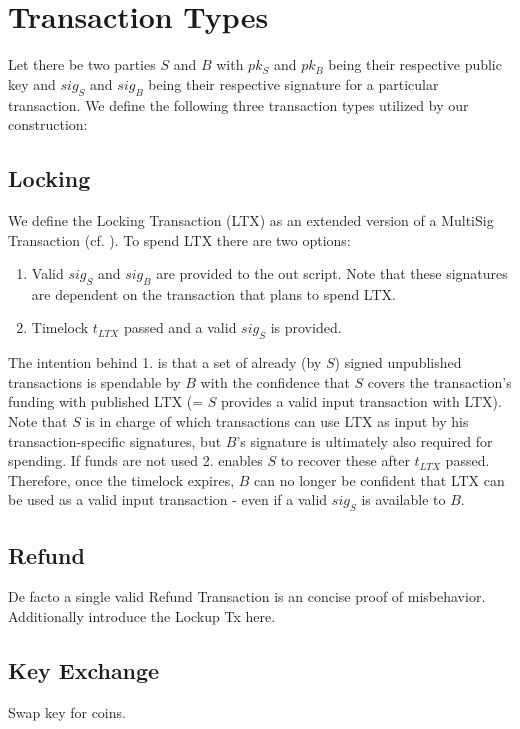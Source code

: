 \documentclass{cacthesis}
\begin{document}
	   \section{Transaction Types}
        Let there be two parties $S$ and $B$ with $pk_S$ and $pk_B$  being their respective public key and $sig_S$ and $sig_B$ being their respective signature for a particular transaction. We define the following three transaction types utilized by our construction:
        
        \subsection{Locking}
        We define the Locking Transaction (LTX) as an extended version of a MultiSig Transaction (cf. ). To spend LTX there are two options:
        \begin{enumerate}
	        \item Valid $sig_S$ and $sig_B$ are provided to the out script. Note that these signatures are dependent on the transaction that plans to spend LTX.
	        \item Timelock $t_{LTX}$ passed and a valid $sig_S$ is provided.
        \end{enumerate}
        The intention behind 1. is that a set of already (by $S$) signed unpublished transactions is spendable by $B$ with the confidence that $S$ covers the transaction's funding with published LTX (= $S$ provides a valid input transaction with LTX). Note that $S$ is in charge of which transactions can use LTX as input by his transaction-specific signatures, but $B$'s signature is ultimately also required for spending.
        If funds are not used 2. enables $S$ to recover these after $t_{LTX}$ passed. Therefore, once the timelock expires, $B$ can no longer be confident that LTX can be used as a valid input transaction - even if a valid $sig_S$ is available to $B$.
        
        \subsection{Refund}
        De facto a single valid Refund Transaction is an concise proof of misbehavior. Additionally introduce the Lockup Tx here.
        
        \subsection{Key Exchange}
        Swap key for coins.
        
\end{document}
